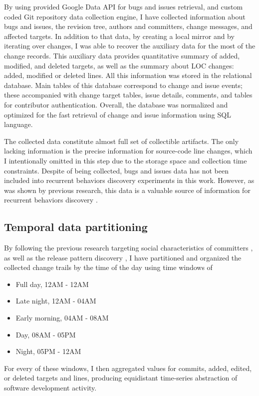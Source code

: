 \documentclass[conference]{IEEEtran}
\begin{document}
By using provided Google Data API for bugs and issues retrieval, and custom coded
Git repository data collection engine, I have collected information about bugs and issues,
the revision tree, authors and committers, change messages, and affected targets. 
In addition to that data, by creating a local mirror and by iterating over changes, I was able 
to recover the auxiliary data for the most of the change records. This auxiliary data provides quantitative
summary of added, modified, and deleted targets, as well as the summary about LOC changes: 
added, modified or deleted lines. All this information 
was stored in the relational database. Main tables of this database correspond to change 
and issue events; these accompanied with change target tables, issue details, comments, and 
tables for contributor authentication. Overall, the database was normalized and optimized 
for the fast retrieval of change and issue information using SQL language.

The collected data constitute almost full set of collectible artifacts. 
The only lacking information is the precise information for source-code line changes, which I 
intentionally omitted in this step due to the storage space and collection time constraints. 
Despite of being collected, bugs and issues data has not been included into recurrent 
behaviors discovery experiments in this work. However, as was shown by previous research, 
this data is a valuable source of information for recurrent behaviors discovery \cite{citeulike:10392277}.

\subsection{Temporal data partitioning} \label{partitioning}
By following the previous research targeting social characteristics of committers \cite{citeulike:10392277}, 
as well as the release pattern discovery \cite{citeulike:10377366}, I have partitioned and organized 
the collected change trails by the time of the day using time windows of
\begin{itemize}
    \item Full day, 12AM - 12AM
    \item Late night, 12AM - 04AM  
    \item Early morning, 04AM - 08AM  
    \item Day, 08AM - 05PM  
    \item Night, 05PM - 12AM
\end{itemize}
For every of these windows, I then aggregated values for commits, added, edited, or deleted 
targets and lines, producing equidistant time-series abstraction of software development activity.
\end{document}

